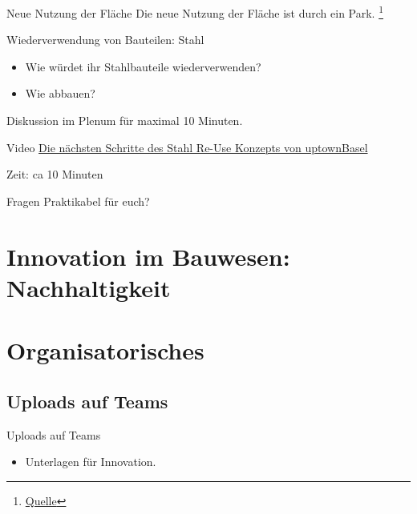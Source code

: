 \begin{frame}{Neue Nutzung der Fläche}
    Die neue Nutzung der Fläche ist durch ein Park. \footnote{\href{https://www.bzbasel.ch/basel/basel-stadt/volta-nord-gruene-oase-mit-83-baeumen-und-einem-zweistoeckigen-pavillon-das-sind-die-plaene-fuer-den-lysbuechelplatz-ld.2576182}{Quelle}}

\end{frame}




\begin{frame}{Wiederverwendung von Bauteilen: Stahl}
    \begin{itemize}
        \item Wie würdet ihr Stahlbauteile  wiederverwenden?
        \item Wie abbauen?
    \end{itemize}
    Diskussion im Plenum für maximal 10 Minuten.
\end{frame}


\begin{frame}{Video}
    \href{https://www.youtube.com/watch?v=D3MBcTZ1tI8}{Die nächsten Schritte des Stahl Re-Use Konzepts von uptownBasel
    }

    Zeit: ca 10 Minuten
\end{frame}

\begin{frame}{Fragen}
    Praktikabel für euch?


\end{frame}

\section{Innovation im Bauwesen: Nachhaltigkeit}



\section{Organisatorisches}
\BlueSectionSlide

\subsection{Uploads auf Teams}
\begin{frame}{Uploads auf Teams}
    \begin{itemize}
        \item[\textbullet] Unterlagen für Innovation.
    \end{itemize}

\end{frame}



